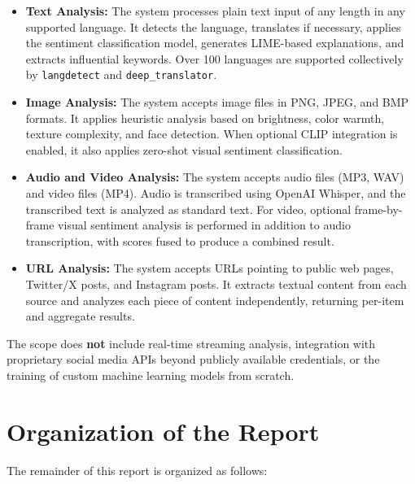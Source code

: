 \documentclass[12pt, a4paper]{report}
\begin{document}
\begin{itemize}[noitemsep, leftmargin=1.5em]
    \item \textbf{Text Analysis:} The system processes plain text input of any length in any supported language. It detects the language, translates if necessary, applies the sentiment classification model, generates LIME-based explanations, and extracts influential keywords. Over 100 languages are supported collectively by \texttt{langdetect} and \texttt{deep\_translator}.
    \item \textbf{Image Analysis:} The system accepts image files in PNG, JPEG, and BMP formats. It applies heuristic analysis based on brightness, color warmth, texture complexity, and face detection. When optional CLIP integration is enabled, it also applies zero-shot visual sentiment classification.
    \item \textbf{Audio and Video Analysis:} The system accepts audio files (MP3, WAV) and video files (MP4). Audio is transcribed using OpenAI Whisper, and the transcribed text is analyzed as standard text. For video, optional frame-by-frame visual sentiment analysis is performed in addition to audio transcription, with scores fused to produce a combined result.
    \item \textbf{URL Analysis:} The system accepts URLs pointing to public web pages, Twitter/X posts, and Instagram posts. It extracts textual content from each source and analyzes each piece of content independently, returning per-item and aggregate results.
\end{itemize}

The scope does \textbf{not} include real-time streaming analysis, integration with proprietary social media APIs beyond publicly available credentials, or the training of custom machine learning models from scratch.

\section{Organization of the Report}

The remainder of this report is organized as follows:
\end{document}
